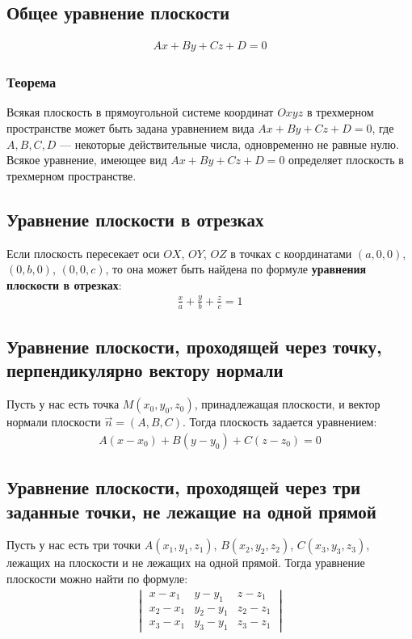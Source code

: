 \documentclass[a4paper,12pt]{extbook}
\theoremstyle{named}
\theoremstyle{named}
\begin{document}
\subsection*{Общее уравнение плоскости}
\begin{gather*}
    Ax + By + Cz + D = 0
\end{gather*}
\subsubsection*{Теорема}
Всякая плоскость в прямоугольной системе координат \(Oxyz\) в трехмерном пространстве может быть задана уравнением вида \(Ax + By + Cz + D = 0\), где \(A, B, C, D\) — некоторые действительные числа, одновременно не равные нулю. Всякое уравнение, имеющее вид \(Ax + By + Cz + D = 0\) определяет плоскость в трехмерном пространстве.


\subsection*{Уравнение плоскости в отрезках}
Если плоскость пересекает оси \(OX\), \(OY\), \(OZ\) в точках с координатами \((a, 0, 0)\), \((0, b, 0)\), \((0, 0, c)\), то она может быть найдена по формуле \textbf{уравнения плоскости в отрезках}:
\begin{gather*}
    \frac{x}{a} + \frac{y}{b} + \frac{z}{c} = 1
\end{gather*}


\subsection*{Уравнение плоскости, проходящей через точку, перпендикулярно вектору нормали}
Пусть у нас есть точка \(M(x_0, y_0, z_0)\), принадлежащая плоскости, и вектор нормали плоскости \(\overrightarrow{n} = (A, B, C)\). Тогда плоскость задается уравнением:
\begin{gather*}
    A(x - x_0) + B(y - y_0) + C(z - z_0) = 0
\end{gather*}


\subsection*{Уравнение плоскости, проходящей через три заданные точки, не лежащие на одной прямой}
Пусть у нас есть три точки \(A(x_1, y_1, z_1)\), \(B(x_2, y_2, z_2)\), \(C(x_3, y_3, z_3)\), лежащих на плоскости и не лежащих на одной прямой. Тогда уравнение плоскости можно найти по формуле:
\begin{gather*}
    \begin{vmatrix}
        x - x_1   & y - y_1   & z - z_1   \\
        x_2 - x_1 & y_2 - y_1 & z_2 - z_1 \\
        x_3 - x_1 & y_3 - y_1 & z_3 - z_1
    \end{vmatrix}
\end{gather*}
\end{document}
